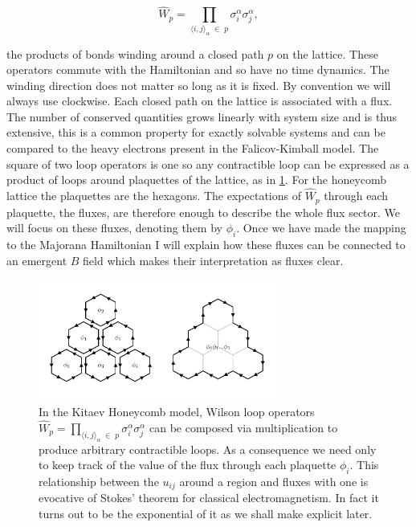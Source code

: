 \[\hat{W}_p = \prod_{\langle i,j\rangle_\alpha\; \in\; p} \sigma_i^{\alpha}\sigma_j^{\alpha},\]

the products of bonds winding around a closed path \(p\) on the lattice. These operators commute with the Hamiltonian and so have no time dynamics. The winding direction does not matter so long as it is fixed. By convention we will always use clockwise. Each closed path on the lattice is associated with a flux. The number of conserved quantities grows linearly with system size and is thus extensive, this is a common property for exactly solvable systems and can be compared to the heavy electrons present in the Falicov-Kimball model. The square of two loop operators is one so any contractible loop can be expressed as a product of loops around plaquettes of the lattice, as in \cref{fig:stokes_theorem}. For the honeycomb lattice the plaquettes are the hexagons. The expectations of \(\hat{W}_p\) through each plaquette, the fluxes, are therefore enough to describe the whole flux sector. We will focus on these fluxes, denoting them by \(\phi_i\). Once we have made the mapping to the Majorana Hamiltonian I will explain how these fluxes can be connected to an emergent \(B\) field which makes their interpretation as fluxes clear.

\hypertarget{fig:stokes_theorem}{%
\begin{figure}
\centering
\includegraphics[width=0.71\textwidth,height=\textheight]{figure_code/amk_chapter/stokes_theorem/stokes_theorem}
\caption[{We can construct arbitrary loops from plaquette fluxes.}]{In the Kitaev Honeycomb model, Wilson loop operators \(\hat{W}_p = \prod_{\langle i,j\rangle_\alpha\; \in\; p} \sigma_i^{\alpha}\sigma_j^{\alpha}\) can be composed via multiplication to produce arbitrary contractible loops. As a consequence we need only to keep track of the value of the flux through each plaquette \(\phi_i\). This relationship between the \(u_{ij}\) around a region and fluxes with one is evocative of Stokes' theorem for classical electromagnetism. In fact it turns out to be the exponential of it as we shall make explicit later.}
\label{fig:stokes_theorem}
\end{figure}
}

